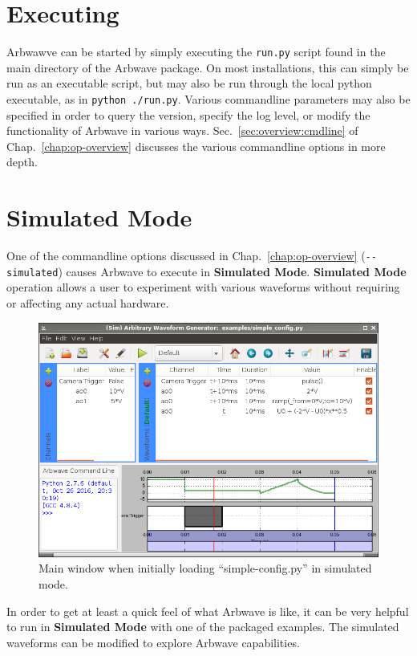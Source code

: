 \thispagestyle{fancy}
\pagestyle{fancy}


\section{Executing}\label{sec:quick:exec}
Arbwawve can be started by simply executing the \verb|run.py| script found in
the main directory of the Arbwave package.  On most installations, this can
simply be run as an executable script, but may also be run through the local 
python executable, as in \verb|python ./run.py|.  Various commandline parameters 
may also be
specified in order to query the version, specify the log level, or modify the
functionality of Arbwave in various ways.  Sec.~\ref{sec:overview:cmdline} of
Chap.~\ref{chap:op-overview} discusses the various commandline options in
more depth.


\section{Simulated Mode}
One of the commandline options discussed in Chap.~\ref{chap:op-overview}
(\verb|--simulated|)
causes Arbwave to execute in \textbf{Simulated Mode}.  \textbf{Simulated Mode}
operation allows a user to experiment with various waveforms without requiring
or affecting any actual hardware.

\begin{figure}[htb!]
  \centerline{\includegraphics[width=.8\textwidth]{figures/main-simple-config}}
  \caption{Main window when initially loading ``simple-config.py'' in simulated
  mode.}
  \label{fig:quick:main-simple-config}
\end{figure}


In order to get at least a quick feel of what Arbwave is like, it can be very
helpful to run in \textbf{Simulated Mode} with one of the packaged examples.  The
simulated waveforms can be modified to explore Arbwave capabilities.

